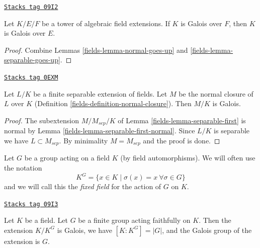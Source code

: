 \begin{lemma}
\label{fields-lemma-galois-goes-up}
\href{https://stacks.math.columbia.edu/tag/09I2}{\texttt{Stacks tag 09I2}}

Let $K/E/F$ be a tower of algebraic field extensions.
If $K$ is Galois over $F$, then $K$ is Galois over $E$.
\end{lemma}

\begin{proof}

Combine Lemmas \ref{fields-lemma-normal-goes-up} and \ref{fields-lemma-separable-goes-up}.
\end{proof}

\begin{lemma}
\label{fields-lemma-normal-closure-galois}
\href{https://stacks.math.columbia.edu/tag/0EXM}{\texttt{Stacks tag 0EXM}}

Let $L/K$ be a finite separable extension of fields.
Let $M$ be the normal closure of $L$ over $K$
(Definition \ref{fields-definition-normal-closure}).
Then $M/K$ is Galois.
\end{lemma}

\begin{proof}

The subextension $M/M_{sep}/K$ of Lemma \ref{fields-lemma-separable-first}
is normal by Lemma \ref{fields-lemma-separable-first-normal}.
Since $L/K$ is separable we have $L \subset M_{sep}$.
By minimality $M = M_{sep}$ and the proof is done.
\end{proof}

Let $G$ be a group acting on a field $K$ (by field automorphisms).
We will often use the notation
$$
K^G = \{x \in K \mid \sigma(x) = x \ \forall \sigma \in G\}
$$
and we will call this the {\it fixed field} for the action of $G$ on $K$.

\begin{lemma}
\label{fields-lemma-galois-over-fixed-field}
\href{https://stacks.math.columbia.edu/tag/09I3}{\texttt{Stacks tag 09I3}}

Let $K$ be a field. Let $G$ be a finite group acting faithfully on $K$.
Then the extension $K/K^G$ is Galois, we have $[K : K^G] = |G|$,
and the Galois group of the extension is $G$.
\end{lemma}

